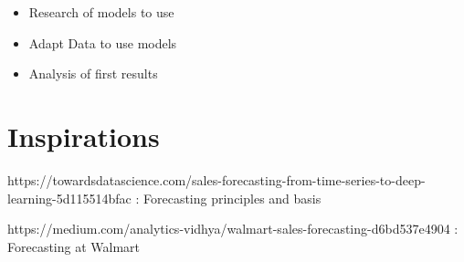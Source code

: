 \documentclass{report}
\begin{document}
\begin{itemize}
\item Research of models to use 
\item Adapt Data to use models
\item Analysis of first results
\end{itemize}


\section{Inspirations}

https://towardsdatascience.com/sales-forecasting-from-time-series-to-deep-learning-5d115514bfac : Forecasting principles and basis 

https://medium.com/analytics-vidhya/walmart-sales-forecasting-d6bd537e4904 : Forecasting at Walmart 
\end{document}
